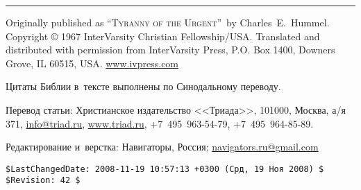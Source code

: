 \documentclass[12pt,article,a4paper,fittopage]{ncc}
\begin{document}
\vspace{0.3cm}
\hrule
\vspace{0.3cm}
\begin{footnotesize}
\noindent
Originally published as \textsc{``Tyranny of the Urgent''}\ by Charles~E.~Hummel.
Copyright \copyright{} 1967 InterVarsity Christian Fellowship/USA. Translated and
distributed with permission from InterVarsity Press, P.O. Box 1400,
Downers Grove, IL 60515, USA. \url{www.ivpress.com}

\vspace{0.2cm}
\noindent
Цитаты Библии в~тексте выполнены по Синодальному переводу.

\vspace{0.2cm}
\noindent
Перевод статьи: Христианское издательство <<Триада>>, 101000, Москва, а/я 371, \url{info@triad.ru}, 
\linebreak  \url{www.triad.ru}, +7~495~963-54-79, +7~495~964-85-89.

\vspace{0.2cm}
\noindent
Редактирование и~верстка: Навигаторы, Россия; \url{navigators.ru@gmail.com}
\end{footnotesize}

{\tiny 
\begin{verbatim}
$LastChangedDate: 2008-11-19 10:57:13 +0300 (Срд, 19 Ноя 2008) $
$Revision: 42 $
\end{verbatim}

}
\end{document}

